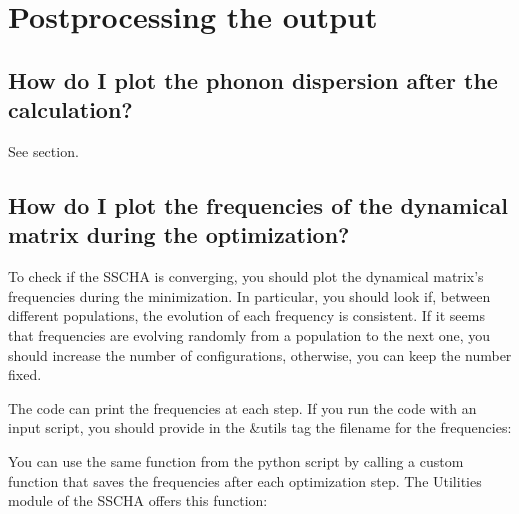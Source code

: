 \documentclass[a4paper,11pt,english]{sphinxmanual}
\begin{document}
\section{Post\sphinxhyphen{}processing the output}
\label{\detokenize{faq:post-processing-the-output}}

\subsection{How do I plot the phonon dispersion after the calculation?}
\label{\detokenize{faq:how-do-i-plot-the-phonon-dispersion-after-the-calculation}}
\sphinxAtStartPar
See {\hyperref[\detokenize{start:plot-the-phonon-dispersion}]{}} section.


\subsection{How do I plot the frequencies of the dynamical matrix during the optimization?}
\label{\detokenize{faq:how-do-i-plot-the-frequencies-of-the-dynamical-matrix-during-the-optimization}}
\sphinxAtStartPar
To check if the SSCHA is converging, you should plot the dynamical matrix’s frequencies during the minimization.
In particular, you should look if, between different populations, the evolution of each frequency is consistent. If it seems that frequencies are evolving randomly from a population to the next one, you should increase the number of configurations, otherwise, you can keep the number fixed.

\sphinxAtStartPar
The code can print the frequencies at each step.
If you run the code with an input script, you should provide in the \&utils tag the filename for the frequencies:

\begin{sphinxVerbatim}[commandchars=\\\{\}]
\end{sphinxVerbatim}

\sphinxAtStartPar
You can use the same function from the python script by calling a custom function that saves the frequencies after each optimization step. The Utilities module of the SSCHA offers this function:

\begin{sphinxVerbatim}[commandchars=\\\{\}]
  

  
\end{sphinxVerbatim}
\end{document}
